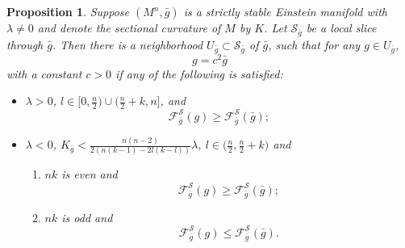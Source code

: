 \documentclass[12pt]{amsart}
\newtheorem{proposition}{Proposition}[section]
\newcommand{\bg}{\bar{g}}
\numberwithin{equation}{section}
\begin{document}
\begin{proposition}\label{Proposition: Regidity}
    Suppose $(M^n,\bg)$ is a strictly stable Einstein manifold with $\lambda\neq0$ and denote the sectional curvature of $M$ by $K$. Let $\mathcal{S}_{\bg}$ be a local slice through $\bg$. Then there is a neighborhood $U_{\bg}\subset\mathcal{S}_{\bg}$ of $\bg$, such that for any $g\in U_{\bg}$,
    \begin{equation*}
        g=c^2\bg
    \end{equation*}
    with a constant $c>0$ if any of the following is satisfied:
        \begin{itemize}
        \item $\lambda>0$, $l\in\big[0,\frac{n}{2}\big)\cup\big(\frac{n}{2}+k,n\big]$, and
    \begin{equation*}
    \mathcal{F}_{{\bg}}^{\mathcal{S}}(g)\geq\mathcal{F}_{{\bg}}^{\mathcal{S}}(\bg);
    \end{equation*}
    \item $\lambda<0$, $K_{\bg} < \frac{n(n-2)}{2\left(n(k-1)-2l(k-l)\right)}\lambda$, $l\in\big(\frac{n}{2},\frac{n}{2}+k\big)$ and
    \begin{enumerate}
        \item $nk$ is even and
        \begin{equation*}
        \mathcal{F}_{{\bg}}^{\mathcal{S}}(g)\geq\mathcal{F}_{{\bg}}^{\mathcal{S}}(\bg);
        \end{equation*}
    \item $nk$ is odd and
        \begin{equation*}
            \mathcal{F}_{{\bg}}^{\mathcal{S}}(g)\leq\mathcal{F}_{{\bg}}^{\mathcal{S}}(\bg).
        \end{equation*}
    \end{enumerate}
    \end{itemize}
\end{proposition}
\end{document}
